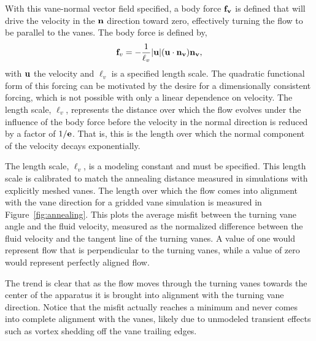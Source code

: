 With this vane-normal vector field specified, a body force ${\bf f_v}$
is defined that will drive the velocity in the ${\bf n}$ direction
toward zero, effectively turning the flow to be parallel to the
vanes. The body force is defined by,
\begin{equation}
 {\bf f}_v= -\frac{1}{\ell_v}|{\bf u}|({\bf u}\cdot{\bf n_v}){\bf n_v},
 \label{eqn:body_force}
\end{equation}
with ${\bf u}$ the velocity and $\ell_v$ is a specified length
scale. The quadratic functional form of this forcing can be motivated by 
the desire for a dimensionally consistent forcing, which is not possible
with only a linear dependence on velocity. The length scale, $\ell_v$,
represents the distance over which the 
flow evolves under the influence of the body force before the
velocity in the normal direction is reduced by a factor of $1/{\bf 
e}$. That is, this is the length over which the normal component of the
velocity decays exponentially. 

The length scale, $\ell_v$, is a modeling constant and must be
specified. This length scale is calibrated to match the annealing
distance measured in simulations with explicitly meshed vanes. The
length over which the flow comes into alignment with the vane direction
for a gridded vane simulation is measured in
Figure~\ref{fig:annealing}. This plots the average misfit between the
turning vane angle and the fluid velocity, measured as the normalized
difference between the fluid velocity and the tangent line of the
turning vanes. A value of one would represent flow that is perpendicular
to the turning vanes, while a value of zero would represent perfectly
aligned flow.   

The trend is clear that as the flow moves through the turning vanes
towards the center of the apparatus it is brought into alignment with
the turning vane direction. Notice that the misfit actually reaches a
minimum and never comes into complete alignment with the vanes, likely
due to unmodeled transient effects such as vortex shedding off the vane
trailing edges.  


